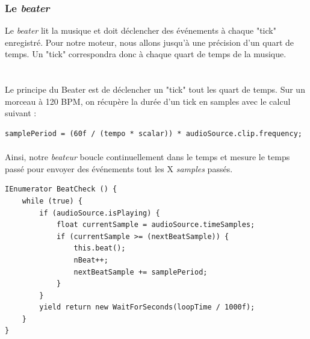 \subsubsection{Le \textit{beater}}
Le \textit{beater} lit la musique et doit déclencher des événements à chaque "tick" enregistré. Pour notre moteur, nous allons jusqu'à une précision d'un quart de temps. Un "tick" correspondra donc à chaque quart de temps de la musique.\\

\\\\

Le principe du Beater est de déclencher un "tick" tout les quart de temps. Sur un morceau à 120 BPM, on récupère la durée d’un tick en samples avec le calcul suivant :

\begin{lstlisting}
samplePeriod = (60f / (tempo * scalar)) * audioSource.clip.frequency;
\end{lstlisting}

\paragraph{}

Ainsi, notre \textit{beateur} boucle continuellement dans le temps et mesure le temps passé pour envoyer des événements tout les X \textit{samples} passés.

\begin{lstlisting}
IEnumerator BeatCheck () {
    while (true) {
        if (audioSource.isPlaying) {
            float currentSample = audioSource.timeSamples;
            if (currentSample >= (nextBeatSample)) {
                this.beat();
                nBeat++;
                nextBeatSample += samplePeriod;
            }
        }
        yield return new WaitForSeconds(loopTime / 1000f);
    }
}
\end{lstlisting}


